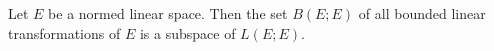 Let $E$ be a normed linear space. Then the set $B(E; E)$ of all bounded linear transformations of $E$ is a subspace of $L(E; E)$.
